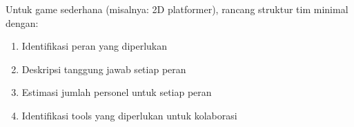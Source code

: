 \begin{latihan}
Untuk game sederhana (misalnya: 2D platformer), rancang struktur tim minimal dengan:
\begin{enumerate}
\item Identifikasi peran yang diperlukan
\item Deskripsi tanggung jawab setiap peran
\item Estimasi jumlah personel untuk setiap peran
\item Identifikasi tools yang diperlukan untuk kolaborasi
\end{enumerate}
\end{latihan}
